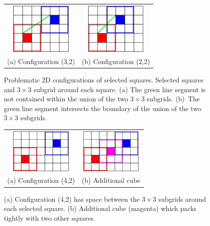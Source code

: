 \begin{figure}[t]
\centering
\begin{tabular}{cc}
\includegraphics[width=1.2in]{images/config2D_3_2.eps} \qquad &
\qquad
\includegraphics[width=1.2in]{images/config2D_2_2.eps} \\
(a) Configuration (3,2) & (b) Configuration (2,2)
\end{tabular}
\caption{Problematic 2D configurations of selected squares.
Selected squares and $3 \times 3$ subgrid around each square.
(a) The green line segment is not contained within the union
of the two $3 \times 3$ subgrids.
(b)~The green line segment intersects the boundary
of the union of the two $3 \times 3$ subgrids.}
\label{fig:loose2D}
\end{figure}

\begin{figure}[t]
\centering
\begin{tabular}{cc}
\includegraphics[width=1.2in]{images/config2D_4_2.eps} \qquad &
\qquad
\includegraphics[width=1.2in]{images/config2D_4_2_B.eps} \\
(a) Configuration (4,2) & (b) Additional cube
\end{tabular}
\caption{(a) Configuration (4,2) has space between the $3 \times 3$
subgrids around each selected square.
(b) Additional cube (magenta) which packs tightly with two other squares.}
\label{fig:config2D_4_2}
\end{figure}

